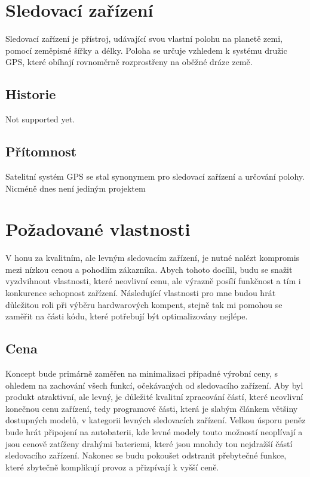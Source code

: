 \documentclass[FM,BP]{tulthesis}
\begin{document}
\section{Sledovací zařízení}
Sledovací zařízení je přístroj, udávající svou vlastní polohu na planetě zemi, pomocí zeměpisné šířky a délky. Poloha se určuje vzhledem k systému družic GPS, které obíhají rovnoměrně rozprostřeny na oběžné dráze země.

\subsection{Historie}
Not supported yet.%

\subsection{Přítomnost}
Satelitní systém GPS se stal synonymem pro sledovací zařízení a určování polohy. Nicméně dnes není jediným projektem %

\section{Požadované vlastnosti}
V honu za kvalitním, ale levným sledovacím zařízení, je nutné nalézt kompromis mezi nízkou cenou a pohodlím zákazníka. Abych tohoto docílil, budu se snažit vyzdvihnout vlastnosti, které neovlivní cenu, ale výrazně posílí funkčnost a tím i konkurence schopnost zařízení. Následující vlastnosti pro mne budou hrát důležitou roli při výběru hardwarových kompent, stejně tak mi pomohou se zaměřit na části kódu, které potřebují být optimalizovány nejlépe.

\subsection{Cena}
Koncept bude primárně zaměřen na minimalizaci případné výrobní ceny, s ohledem na zachování všech funkcí, očekávaných od sledovacího zařízení. Aby byl produkt atraktivní, ale levný, je důležité kvalitní zpracování částí, které neovlivní konečnou cenu zařízení, tedy programové části, která je slabým článkem většiny dostupných modelů, v kategorii levných sledovacích zařízení. Velkou úsporu peněz bude hrát připojení na autobaterii, kde levné modely touto možností neoplívají a jsou cenově zatíženy drahými bateriemi, které jsou mnohdy tou nejdražší částí sledovacího zařízení. Nakonec se budu pokoušet odstranit přebytečné funkce, které zbytečně komplikují provoz a přizpívají k vyšší ceně.
\end{document}
